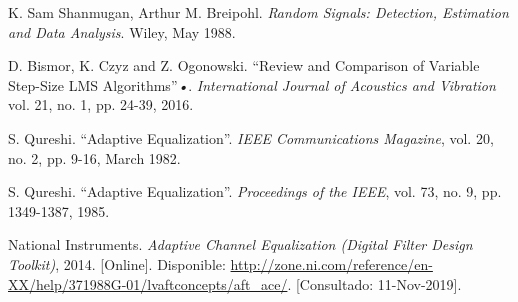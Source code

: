 \documentclass[main.tex]{subfiles}
\begin{document}
\begin{thebibliography}{00}
    K. Sam Shanmugan, Arthur M. Breipohl.
    \textit{Random Signals: Detection, Estimation and Data Analysis}.
    Wiley, May 1988.

    D. Bismor, K. Czyz and Z. Ogonowski. ``Review and Comparison of Variable Step-Size LMS Algorithms''\textsl{•}. 
    \textit{International Journal of Acoustics and Vibration} vol. 21, no. 1, pp. 24-39, 2016.

    S. Qureshi. ``Adaptive Equalization''.
    \textit{IEEE Communications Magazine}, vol. 20, no. 2, pp. 9-16, March 1982.

    S. Qureshi. ``Adaptive Equalization''.
    \textit{Proceedings of the IEEE}, vol. 73, no. 9, pp. 1349-1387, 1985.
    
     National Instruments.
    \textit{Adaptive Channel Equalization (Digital Filter Design Toolkit)}, 2014. [Online]. Disponible: \url{http://zone.ni.com/reference/en-XX/help/371988G-01/lvaftconcepts/aft_ace/}. [Consultado: 11-Nov-2019].

    
\end{thebibliography}
\end{document}
